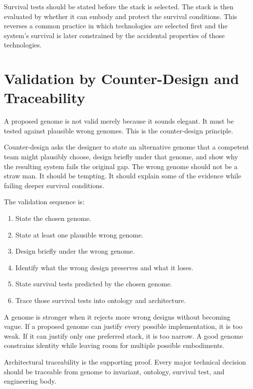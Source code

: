 \documentclass[11pt]{article}
\begin{document}
Survival tests should be stated before the stack is selected. The stack is then evaluated by whether it can embody and protect the survival conditions. This reverses a common practice in which technologies are selected first and the system's survival is later constrained by the accidental properties of those technologies.

\section{Validation by Counter-Design and Traceability}

A proposed genome is not valid merely because it sounds elegant. It must be tested against plausible wrong genomes. This is the counter-design principle.

Counter-design asks the designer to state an alternative genome that a competent team might plausibly choose, design briefly under that genome, and show why the resulting system fails the original gap. The wrong genome should not be a straw man. It should be tempting. It should explain some of the evidence while failing deeper survival conditions.

The validation sequence is:

\begin{enumerate}[leftmargin=*]
    \item State the chosen genome.
    \item State at least one plausible wrong genome.
    \item Design briefly under the wrong genome.
    \item Identify what the wrong design preserves and what it loses.
    \item State survival tests predicted by the chosen genome.
    \item Trace those survival tests into ontology and architecture.
\end{enumerate}

A genome is stronger when it rejects more wrong designs without becoming vague. If a proposed genome can justify every possible implementation, it is too weak. If it can justify only one preferred stack, it is too narrow. A good genome constrains identity while leaving room for multiple possible embodiments.

Architectural traceability is the supporting proof. Every major technical decision should be traceable from genome to invariant, ontology, survival test, and engineering body.
\end{document}
